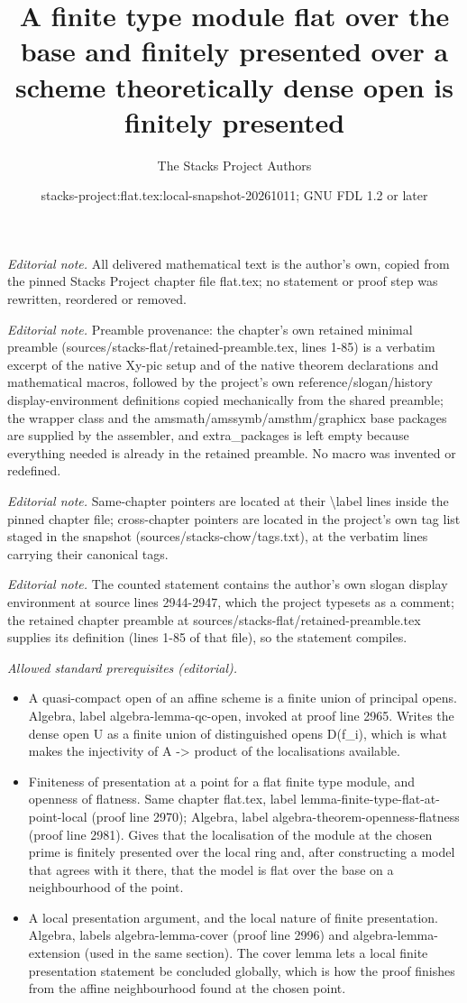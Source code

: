 \documentclass[10pt,a4paper]{amsart}
\title{A finite type module flat over the base and finitely presented over a scheme theoretically dense open is finitely presented}
\author{The Stacks Project Authors}
\date{stacks-project:flat.tex:local-snapshot-20261011; GNU FDL 1.2 or later}
\theoremstyle{plain}
\theoremstyle{definition}
\theoremstyle{remark}
\numberwithin{equation}{subsection}
\begin{document}
\maketitle
\noindent\textit{Editorial note.} All delivered mathematical text is the author's own, copied from the pinned Stacks Project chapter file flat.tex; no statement or proof step was rewritten, reordered or removed.\par\medskip
\noindent\textit{Editorial note.} Preamble provenance: the chapter's own retained minimal preamble (sources/stacks-flat/retained-preamble.tex, lines 1-85) is a verbatim excerpt of the native Xy-pic setup and of the native theorem declarations and mathematical macros, followed by the project's own reference/slogan/history display-environment definitions copied mechanically from the shared preamble; the wrapper class and the amsmath/amssymb/amsthm/graphicx base packages are supplied by the assembler, and extra\_packages is left empty because everything needed is already in the retained preamble. No macro was invented or redefined.\par\medskip
\noindent\textit{Editorial note.} Same-chapter pointers are located at their \textbackslash{}label lines inside the pinned chapter file; cross-chapter pointers are located in the project's own tag list staged in the snapshot (sources/stacks-chow/tags.txt), at the verbatim lines carrying their canonical tags.\par\medskip
\noindent\textit{Editorial note.} The counted statement contains the author's own slogan display environment at source lines 2944-2947, which the project typesets as a comment; the retained chapter preamble at sources/stacks-flat/retained-preamble.tex supplies its definition (lines 1-85 of that file), so the statement compiles.\par\medskip
\noindent\textit{Allowed standard prerequisites (editorial).}\begin{itemize}
\item A quasi-compact open of an affine scheme is a finite union of principal opens. Algebra, label algebra-lemma-qc-open, invoked at proof line 2965. Writes the dense open U as a finite union of distinguished opens D(f\_i), which is what makes the injectivity of A -> product of the localisations available.
\item Finiteness of presentation at a point for a flat finite type module, and openness of flatness. Same chapter flat.tex, label lemma-finite-type-flat-at-point-local (proof line 2970); Algebra, label algebra-theorem-openness-flatness (proof line 2981). Gives that the localisation of the module at the chosen prime is finitely presented over the local ring and, after constructing a model that agrees with it there, that the model is flat over the base on a neighbourhood of the point.
\item A local presentation argument, and the local nature of finite presentation. Algebra, labels algebra-lemma-cover (proof line 2996) and algebra-lemma-extension (used in the same section). The cover lemma lets a local finite presentation statement be concluded globally, which is how the proof finishes from the affine neighbourhood found at the chosen point.
\end{itemize}\medskip
\end{document}
